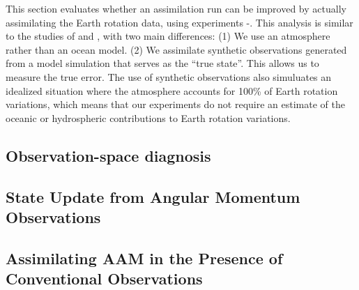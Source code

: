 This section evaluates whether an assimilation run can be improved by actually assimilating the Earth rotation data, using experiments \NODA-\ERPRST.
This analysis is similar to the studies of \citet{Saynisch2010,Saynisch2011} and \citet{Saynisch2012}, with two main differences:
(1) We use an atmosphere rather than an ocean model.
(2) We assimilate synthetic observations generated from a model simulation that serves as the ``true state''. This allows us to measure the true error.
The use of synthetic observations also simuluates an idealized situation where the atmosphere accounts for 100\% of Earth rotation variations, which means that our experiments do not require an estimate of the oceanic or hydrospheric contributions to Earth rotation variations.

\subsection{Observation-space diagnosis}
\label{sec:obs_space}


\subsection{State Update from Angular Momentum Observations}
\label{sec:erpda}


\subsection{Assimilating AAM in the Presence of Conventional Observations}
\label{sec:added_value}


